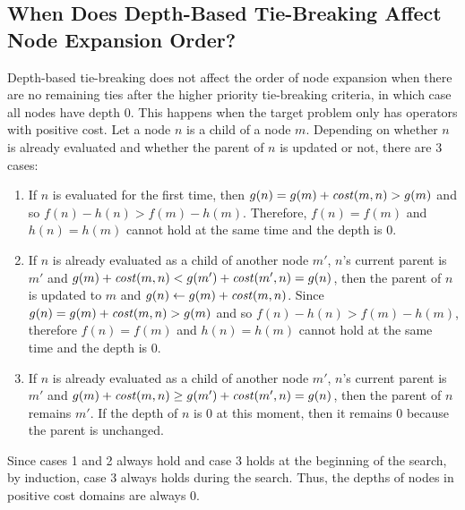 
\subsection{When Does Depth-Based Tie-Breaking Affect Node Expansion Order?}

Depth-based tie-breaking does not affect the order of node expansion when there are no remaining ties after the
higher priority tie-breaking criteria, in which case all nodes have depth 0. 
% 
This happens when the target problem only has operators with positive cost.
Let a node $n$ is a child of a node $m$. Depending on whether $n$ is already evaluated and whether the parent of $n$ is updated or not, there are 3 cases:

\begin{enumerate}
 \item If $n$ is evaluated for the first time,
       then $g(n)=g(m)+\mit{cost}(m,n) > g(m)$ and so $f(n)-h(n) > f(m)-h(m)$.
       Therefore, $f(n)=f(m)$ and $h(n)=h(m)$ cannot hold at the same time and the depth is 0.
 \item If $n$ is already evaluated as a child of another node $m'$, $n$'s current parent is $m'$ and
       $g(m)+\mit{cost}(m,n) < g(m') + \mit{cost}(m',n) = g(n)$,
       then the parent of $n$ is updated to $m$ and $g(n)\leftarrow g(m)+\mit{cost}(m,n)$.
       Since $g(n)=g(m)+\mit{cost}(m,n)>g(m)$ and so $f(n)-h(n) > f(m)-h(m)$,
       therefore $f(n)=f(m)$ and $h(n)=h(m)$ cannot hold at the same time and the depth is 0.
 \item If $n$ is already evaluated as a child of another node $m'$, $n$'s current parent is $m'$ and
       $g(m)+\mit{cost}(m,n) \geq g(m') + \mit{cost}(m',n) = g(n)$, then the parent of $n$ remains $m'$. If the
       depth of $n$ is 0 at this moment, then it remains 0 because the parent is unchanged.
\end{enumerate}
% 
Since cases 1 and 2 always hold and case 3 holds at the beginning of the search,
by induction, case 3 always holds during the search.
Thus, the depths of nodes in positive cost domains are always 0.

